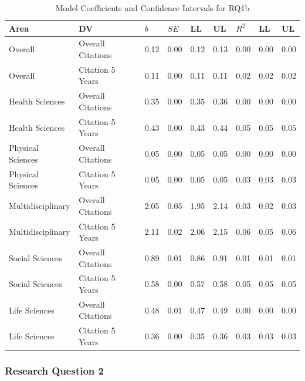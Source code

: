 \documentclass[
  man,floatsintext]{apa6}
\begin{document}
\begin{table}[tbp]

\begin{center}
\begin{threeparttable}

\caption{\label{tab:tab-rq1b}Model Coefficients and Confidence Intervals for RQ1b}

\begin{tabular}{lllllllll}
\toprule
Area & DV & $b$ & $SE$ & LL & UL & $R^2$ & LL & UL\\
\midrule
Overall & Overall Citations & 0.12 & 0.00 & 0.12 & 0.13 & 0.00 & 0.00 & 0.00\\
Overall & Citation 5 Years & 0.11 & 0.00 & 0.11 & 0.11 & 0.02 & 0.02 & 0.02\\
Health Sciences & Overall Citations & 0.35 & 0.00 & 0.35 & 0.36 & 0.00 & 0.00 & 0.00\\
Health Sciences & Citation 5 Years & 0.43 & 0.00 & 0.43 & 0.44 & 0.05 & 0.05 & 0.05\\
Physical Sciences & Overall Citations & 0.05 & 0.00 & 0.05 & 0.05 & 0.00 & 0.00 & 0.00\\
Physical Sciences & Citation 5 Years & 0.05 & 0.00 & 0.05 & 0.05 & 0.03 & 0.03 & 0.03\\
Multidisciplinary & Overall Citations & 2.05 & 0.05 & 1.95 & 2.14 & 0.03 & 0.02 & 0.03\\
Multidisciplinary & Citation 5 Years & 2.11 & 0.02 & 2.06 & 2.15 & 0.06 & 0.05 & 0.06\\
Social Sciences & Overall Citations & 0.89 & 0.01 & 0.86 & 0.91 & 0.01 & 0.01 & 0.01\\
Social Sciences & Citation 5 Years & 0.58 & 0.00 & 0.57 & 0.58 & 0.05 & 0.05 & 0.05\\
Life Sciences & Overall Citations & 0.48 & 0.01 & 0.47 & 0.49 & 0.00 & 0.00 & 0.00\\
Life Sciences & Citation 5 Years & 0.36 & 0.00 & 0.35 & 0.36 & 0.03 & 0.03 & 0.03\\
\bottomrule
\end{tabular}

\end{threeparttable}
\end{center}

\end{table}

\hypertarget{research-question-2}{%
\subsubsection{Research Question 2}\label{research-question-2}}
\end{document}
